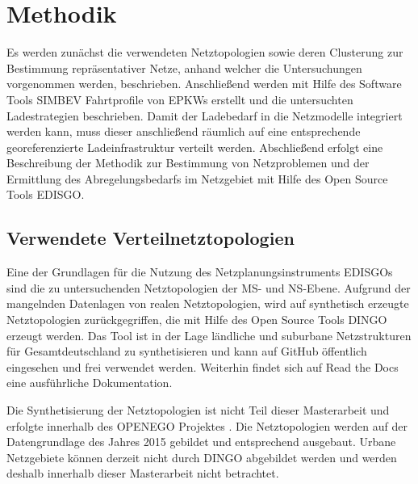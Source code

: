 \section{Methodik}\label{chap:Methodik}

Es werden zunächst die verwendeten Netztopologien sowie deren Clusterung zur Bestimmung repräsentativer Netze, anhand welcher die Untersuchungen vorgenommen werden, beschrieben.
Anschließend werden mit Hilfe des Software Tools \gls{SIMBEV} Fahrtprofile von \glspl{EPKW} erstellt und die untersuchten Ladestrategien beschrieben.
Damit der Ladebedarf in die Netzmodelle integriert werden kann, muss dieser anschließend räumlich auf eine entsprechende georeferenzierte Ladeinfrastruktur verteilt werden.
Abschließend erfolgt eine Beschreibung der Methodik zur Bestimmung von Netzproblemen und der Ermittlung des Abregelungsbedarfs im Netzgebiet mit Hilfe des Open Source Tools \gls{EDISGO}.


\subsection{Verwendete Verteilnetztopologien}\label{chap:dingo_theo}

Eine der Grundlagen für die Nutzung des Netzplanungsinstruments \glspl{EDISGO} sind die zu untersuchenden Netztopologien der \gls{MS}- und \gls{NS}-Ebene.
Aufgrund der mangelnden Datenlagen von realen Netztopologien, wird auf synthetisch erzeugte Netztopologien zurückgegriffen, die mit Hilfe des Open Source Tools \gls{DINGO} erzeugt werden.
Das Tool ist in der Lage ländliche und suburbane Netzstrukturen für Gesamtdeutschland zu synthetisieren und kann auf GitHub \cite{dingo2019} öffentlich eingesehen und frei verwendet werden.
Weiterhin findet sich auf Read the Docs \cite{dingo-docs2019} eine ausführliche Dokumentation.\medskip

Die Synthetisierung der Netztopologien ist nicht Teil dieser Masterarbeit und erfolgte innerhalb des \gls{OPENEGO} Projektes \cite{Mueller2019}.
Die Netztopologien werden auf der Datengrundlage des Jahres \num{2015} gebildet und entsprechend ausgebaut.
Urbane Netzgebiete können derzeit nicht durch \gls{DINGO} abgebildet werden und werden deshalb innerhalb dieser Masterarbeit nicht betrachtet. \medskip


